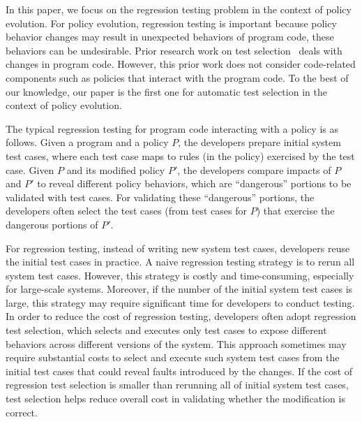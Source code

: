 In this paper, we focus on the regression testing problem in the context of policy evolution.
For policy evolution, regression testing is important because policy behavior changes may
result in unexpected behaviors of program code, these behaviors can be undesirable.
Prior research work on test selection~\cite{Rothermel:1996:ART:235681.235682,Graves:2001:ESR:367008.367020,Elbaum:2000:PTC:347324.348910}
deals with changes in program code.
However, this prior work does not consider code-related components such as policies that interact with the program code.
To the best of our knowledge,
our paper is the first one for automatic test selection in the context of policy
evolution.

The typical regression testing for program code interacting with a policy is as follows.
Given a program and a policy $P$, the developers prepare initial system test cases, where
each test case maps to rules (in the policy) exercised by the test case. Given $P$ and its modified
policy $P'$, the developers compare impacts of $P$ and $P'$ to
reveal different policy behaviors, which are ``dangerous'' portions to be validated with
test cases. For validating these ``dangerous'' portions, the developers often select the test cases (from test cases for $P$) that exercise the dangerous
portions of $P'$.

For regression testing, instead of writing new system test cases, developers reuse the initial test cases in practice. A naive regression testing strategy is to rerun all system test cases. However,
 this strategy is costly and time-consuming, especially for large-scale systems. Moreover, if the number of the initial 
system test cases is large, this strategy may require significant time for developers to conduct testing. In order to
 reduce the cost of regression testing, developers often adopt regression test selection, which selects and executes only
 test cases to expose different behaviors across different versions of the system. This approach sometimes may require substantial
 costs to select and execute such system test cases from the initial test cases that could reveal faults introduced by the changes. 
If the cost of regression test selection is smaller than rerunning all of initial system test cases, test selection helps reduce overall cost in validating whether the modification is correct.


